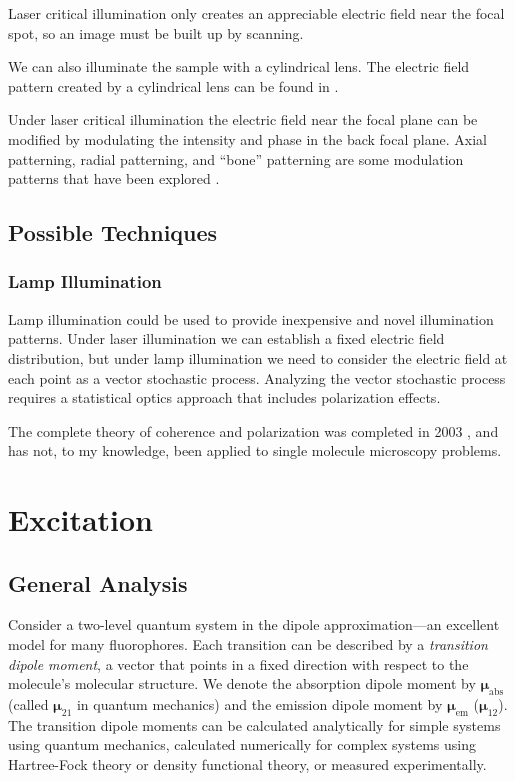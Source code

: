 \documentclass[11pt]{article}
\providecommand{\bs}[1]{\boldsymbol{#1}}
\begin{document}
Laser critical illumination only creates an appreciable electric field near the
focal spot, so an image must be built up by scanning. 

We can also illuminate the sample with a cylindrical lens. The electric field
pattern created by a cylindrical lens can be found in \cite{youngworth}.

Under laser critical illumination the electric field near the focal plane can be
modified by modulating the intensity and phase in the back focal plane.
Axial patterning, radial patterning, and ``bone'' patterning are some modulation
patterns that have been explored \cite{debarre}.

\subsection{Possible Techniques}
\subsubsection{Lamp Illumination}
Lamp illumination could be used to provide inexpensive and novel illumination
patterns. Under laser illumination we can establish a fixed electric field
distribution, but under lamp illumination we need to consider the electric field
at each point as a vector stochastic process. Analyzing the vector stochastic
process requires a statistical optics approach that includes polarization
effects.

The complete theory of coherence and polarization was completed in 2003
\cite{wolf}, and has not, to my knowledge, been applied to single molecule
microscopy problems.

\section{Excitation}
\subsection{General Analysis}
Consider a two-level quantum system in the dipole approximation---an excellent
model for many fluorophores. Each transition can be described by a
\textit{transition dipole moment}, a vector that points in a fixed direction
with respect to the molecule's molecular structure. We denote the absorption
dipole moment by $\bs{\mu}_{\text{abs}}$ (called $\bs{\mu}_{21}$ in quantum
mechanics) and the emission dipole moment by $\bs{\mu}_{\text{em}}$
($\bs{\mu}_{12}$). The transition dipole moments can be calculated analytically
for simple systems using quantum mechanics, calculated numerically for complex
systems using Hartree-Fock theory or density functional theory, or measured
experimentally. 
\end{document}
